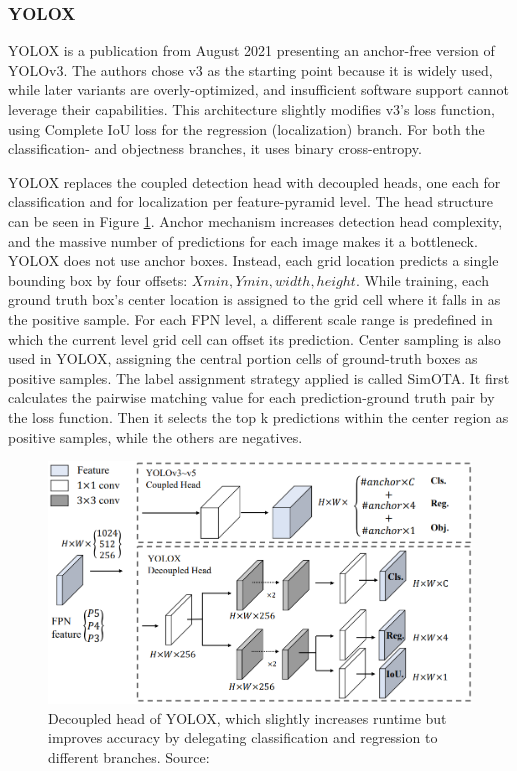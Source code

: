 \subsubsection{YOLOX}

YOLOX\cite{YOLOX} is a publication from August 2021 presenting an anchor-free version of YOLOv3. The authors chose v3 as the starting point because it is widely used, while later variants are overly-optimized, and insufficient software support cannot leverage their capabilities. This architecture slightly modifies v3's loss function, using Complete IoU loss\cite{IoULosses} for the regression (localization) branch. For both the classification- and objectness branches, it uses binary cross-entropy.

YOLOX replaces the coupled detection head with decoupled heads, one each for classification and for localization per feature-pyramid level. The head structure can be seen in Figure \ref{fig:YOLOX_decoupled_head}. Anchor mechanism increases detection head complexity, and the massive number of predictions for each image makes it a bottleneck. YOLOX does not use anchor boxes. Instead, each grid location predicts a single bounding box by four offsets: \(Xmin, Ymin, width, height\). While training, each ground truth box's center location is assigned to the grid cell where it falls in as the positive sample. For each FPN level, a different scale range is predefined in which the current level grid cell can offset its prediction. Center sampling is also used in YOLOX, assigning the central portion cells of ground-truth boxes as positive samples. The label assignment strategy applied is called SimOTA. It first calculates the pairwise matching value for each prediction-ground truth pair by the loss function. Then it selects the top k predictions within the center region as positive samples, while the others are negatives.

\begin{figure}[htb]
 \centerline{\includegraphics[width=1.0\columnwidth]{.//Figure/Detector/YOLOX_decoupled_head.png}}
 \caption{Decoupled head of YOLOX, which slightly increases runtime but improves accuracy by delegating classification and regression to different branches. Source: \cite{YOLOX}}
 \label{fig:YOLOX_decoupled_head}
\end{figure}

